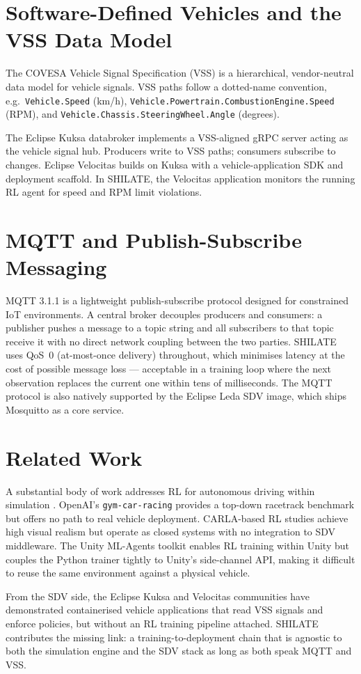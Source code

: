 \section{Software-Defined Vehicles and the VSS Data Model}
\label{sec:sdv-vss}

The COVESA Vehicle Signal Specification (VSS) \cite{COVESA2023} is a
hierarchical, vendor-neutral data model for vehicle signals. VSS paths
follow a dotted-name convention, e.g.\ \texttt{Vehicle.Speed} (km/h),
\texttt{Vehicle.Powertrain.CombustionEngine.Speed} (RPM), and
\texttt{Vehicle.Chassis.SteeringWheel.Angle} (degrees).

The Eclipse Kuksa databroker \cite{EclipseKuksa2024} implements a
VSS-aligned gRPC server acting as the vehicle signal hub. Producers write
to VSS paths; consumers subscribe to changes. Eclipse Velocitas
\cite{EclipseVelocitas2024} builds on Kuksa with a vehicle-application
SDK and deployment scaffold. In SHILATE, the Velocitas application
monitors the running RL agent for speed and RPM limit violations.

\section{MQTT and Publish-Subscribe Messaging}
\label{sec:mqtt}

MQTT 3.1.1 \cite{OASIS2014} is a lightweight publish-subscribe protocol
designed for constrained IoT environments. A central broker decouples
producers and consumers: a publisher pushes a message to a topic string
and all subscribers to that topic receive it with no direct network
coupling between the two parties. SHILATE uses QoS~0 (at-most-once
delivery) throughout, which minimises latency at the cost of possible
message loss --- acceptable in a training loop where the next observation
replaces the current one within tens of milliseconds. The MQTT protocol
is also natively supported by the Eclipse Leda SDV image, which ships
Mosquitto as a core service.

\section{Related Work}
\label{sec:related}

A substantial body of work addresses RL for autonomous driving within
simulation \cite{Kiran2021}. OpenAI's \texttt{gym-car-racing}
\cite{Brockman2016} provides a top-down racetrack benchmark but offers no
path to real vehicle deployment. CARLA-based RL studies
\cite{Dosovitskiy2017} achieve high visual realism but operate as closed
systems with no integration to SDV middleware. The Unity ML-Agents toolkit
\cite{Juliani2020} enables RL training within Unity but couples the Python
trainer tightly to Unity's side-channel API, making it difficult to reuse
the same environment against a physical vehicle.

From the SDV side, the Eclipse Kuksa and Velocitas communities have
demonstrated containerised vehicle applications that read VSS signals and
enforce policies, but without an RL training pipeline attached. SHILATE
contributes the missing link: a training-to-deployment chain that is
agnostic to both the simulation engine and the SDV stack as long as both
speak MQTT and VSS.
